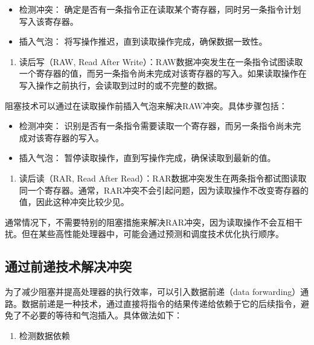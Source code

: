 \begin{itemize}
\item
  检测冲突： 确定是否有一条指令正在读取某个寄存器，同时另一条指令计划写入该寄存器。
\item
  插入气泡： 将写操作推迟，直到读取操作完成，确保数据一致性。
\end{itemize}

\begin{enumerate}
\def\labelenumi{\arabic{enumi}.}
\setcounter{enumi}{2}
\tightlist
\item
  读后写（RAW, Read After Write）：RAW数据冲突发生在一条指令试图读取一个寄存器的值，而另一条指令尚未完成对该寄存器的写入。如果读取操作在写入操作之前执行，会读取到过时的或不完整的数据。
\end{enumerate}

阻塞技术可以通过在读取操作前插入气泡来解决RAW冲突。具体步骤包括：

\begin{itemize}
\item
  检测冲突： 识别是否有一条指令需要读取一个寄存器，而另一条指令尚未完成对该寄存器的写入。
\item
  插入气泡： 暂停读取操作，直到写操作完成，确保读取到最新的值。
\end{itemize}

\begin{enumerate}
\def\labelenumi{\arabic{enumi}.}
\setcounter{enumi}{3}
\tightlist
\item
  读后读（RAR, Read After Read）：RAR数据冲突发生在两条指令都试图读取同一个寄存器。通常，RAR冲突不会引起问题，因为读取操作不改变寄存器的值，因此这种冲突比较少见。
\end{enumerate}

通常情况下，不需要特别的阻塞措施来解决RAR冲突，因为读取操作不会互相干扰。但在某些高性能处理器中，可能会通过预测和调度技术优化执行顺序。

\subsection{通过前递技术解决冲突}\label{sec:05-simple-cpu-017}

为了减少阻塞并提高处理器的执行效率，可以引入数据前递（data forwarding）通路。数据前递是一种技术，通过直接将指令的结果传递给依赖于它的后续指令，避免了不必要的等待和气泡插入。具体做法如下：

\begin{enumerate}
\def\labelenumi{\arabic{enumi}.}
\tightlist
\item
  检测数据依赖
\end{enumerate}

